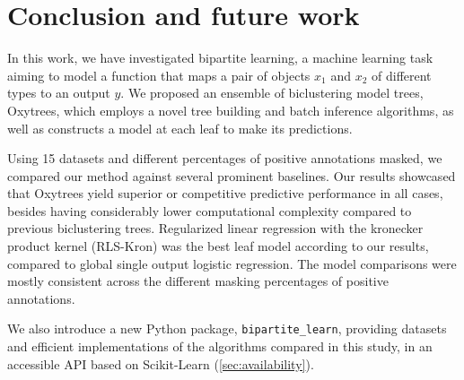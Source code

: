 \documentclass[sn-mathphys-num]{sn-jnl}%
\theoremstyle{thmstyleone}%
\theoremstyle{thmstyletwo}%
\theoremstyle{thmstylethree}%
\begin{document}
\section{Conclusion and future work}
\label{sec:conclusion}

In this work, we have investigated bipartite learning, a machine learning task aiming to model a function that maps a pair of objects $x_1$ and $x_2$ of different types to an output $y$. We proposed an ensemble of biclustering model trees, Oxytrees, which employs a novel tree building and batch inference algorithms, as well as constructs a model at each leaf to make its predictions.

Using 15 datasets and different percentages of positive annotations masked, we compared our method against several prominent baselines.
Our results showcased that Oxytrees yield superior or competitive predictive performance in all cases, besides having considerably lower computational complexity compared to previous biclustering trees.
%
Regularized linear regression with the kronecker product kernel (RLS-Kron) was the best leaf model according to our results, compared to global single output logistic regression.
The model comparisons were mostly consistent across the different masking percentages of positive annotations.

We also introduce a new Python package, \texttt{bipartite\_learn}, providing datasets and efficient implementations of the algorithms compared in this study, in an accessible API based on Scikit-Learn (\autoref{sec:availability}).
%
\end{document}
